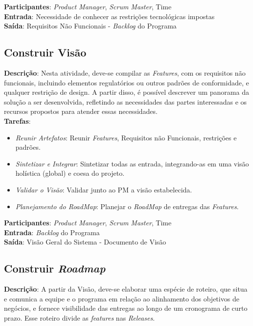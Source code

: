   \textbf{Participantes}: \textit{Product Manager}, \textit{Scrum Master}, Time \\

  \textbf{Entrada}:  Necessidade de conhecer as restrições tecnológicas impostas\\

  \textbf{Saída}:  Requisitos Não Funcionais - \textit{Backlog} do Programa\\

\subsection{Construir Visão}
  \textbf{Descrição}: Nesta atividade, deve-se compilar as \textit{Features}, com os requisitos não funcionais, incluindo elementos
  regulatórios ou outros padrões de conformidade, e qualquer restrição de design. A partir disso, é possível descrever um panorama da solução a
  ser desenvolvida, refletindo as necessidades das partes interessadas e os recursos propostos para atender essas necessidades. \\

  \textbf{Tarefas}:
  \begin{itemize}
   \item \indent \textit{Reunir Artefatos}: Reunir \textit{Features}, Requisitos não Funcionais, restrições e padrões.

   \item \indent \textit{Sintetizar e Integrar}: Sintetizar todas as entrada, integrando-as em uma visão holística (global) e coesa do projeto.

   \item \indent \textit{Validar o Visão}: Validar junto ao PM a visão estabelecida.

   \item \indent \textit{Planejamento do \textit{RoadMap}}: Planejar o \textit{RoadMap} de entregas das \textit{Features}.
  \end{itemize}

  \textbf{Participantes}: \textit{Product Manager}, \textit{Scrum Master}, Time \\

  \textbf{Entrada}: \textit{Backlog} do Programa \\

  \textbf{Saída}:  Visão Geral do Sistema - Documento de Visão\\

\subsection{Construir \textit{Roadmap}}
  \textbf{Descrição}: A partir da Visão, deve-se elaborar uma espécie de roteiro, que situa e comunica a equipe e o programa em relação ao
  alinhamento dos objetivos de negócios, e fornece visibilidade das entregas ao longo de um cronograma de curto prazo.
  Esse roteiro divide as \textit{features} nas \textit{Releases}. \\


